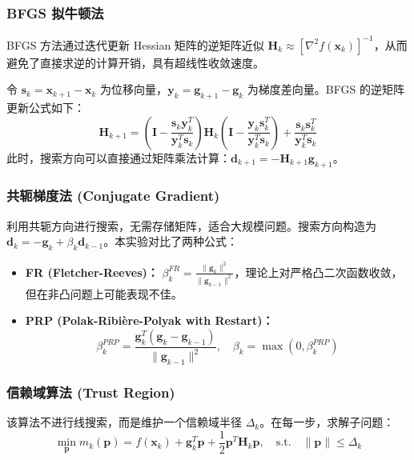 \documentclass[a4paper,12pt]{article}
\begin{document}
\subsubsection{BFGS 拟牛顿法}
BFGS 方法通过迭代更新 Hessian 矩阵的逆矩阵近似 $\bm{H}_k \approx [\nabla^2 f(\bm{x}_k)]^{-1}$，从而避免了直接求逆的计算开销，具有超线性收敛速度。

令 $\bm{s}_k = \bm{x}_{k+1} - \bm{x}_k$ 为位移向量，$\bm{y}_k = \bm{g}_{k+1} - \bm{g}_k$ 为梯度差向量。BFGS 的逆矩阵更新公式如下：
\begin{equation}
    \bm{H}_{k+1} = \left(\bm{I} - \frac{\bm{s}_k \bm{y}_k^T}{\bm{y}_k^T \bm{s}_k}\right) \bm{H}_k \left(\bm{I} - \frac{\bm{y}_k \bm{s}_k^T}{\bm{y}_k^T \bm{s}_k}\right) + \frac{\bm{s}_k \bm{s}_k^T}{\bm{y}_k^T \bm{s}_k}
\end{equation}
此时，搜索方向可以直接通过矩阵乘法计算：$\bm{d}_{k+1} = -\bm{H}_{k+1} \bm{g}_{k+1}$。

\subsubsection{共轭梯度法 (Conjugate Gradient)}

利用共轭方向进行搜索，无需存储矩阵，适合大规模问题。搜索方向构造为 $\bm{d}_k = -\bm{g}_k + \beta_k \bm{d}_{k-1}$。本实验对比了两种公式：
\begin{itemize}
    \item \textbf{FR (Fletcher-Reeves)：} $\beta_k^{FR} = \frac{\|\bm{g}_k\|^2}{\|\bm{g}_{k-1}\|^2}$，理论上对严格凸二次函数收敛，但在非凸问题上可能表现不佳。
    \item \textbf{PRP (Polak-Ribière-Polyak with Restart)：} 
    \begin{equation}
        \beta_k^{PRP} = \frac{\bm{g}_k^T(\bm{g}_k - \bm{g}_{k-1})}{\|\bm{g}_{k-1}\|^2}, \quad \beta_k = \max(0, \beta_k^{PRP})
    \end{equation}
\end{itemize}

\subsubsection{信赖域算法 (Trust Region)}

该算法不进行线搜索，而是维护一个信赖域半径 $\Delta_k$。在每一步，求解子问题：
\begin{equation}
    \min_{\bm{p}} m_k(\bm{p}) = f(\bm{x}_k) + \bm{g}_k^T \bm{p} + \frac{1}{2} \bm{p}^T \bm{H}_k \bm{p}, \quad \text{s.t.} \quad \|\bm{p}\| \le \Delta_k
\end{equation}
\end{document}
